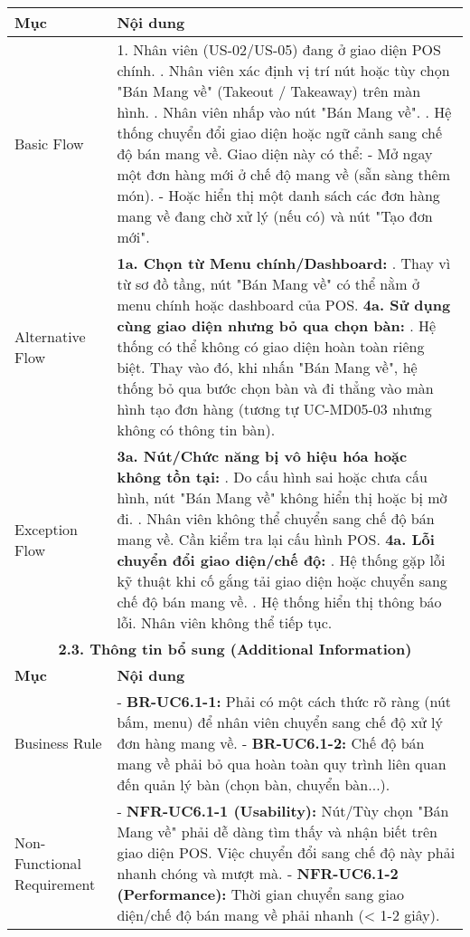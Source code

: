 \begin{longtable}{|m{4cm}|p{11cm}|}
\hline
\textbf{Mục} & \textbf{Nội dung} \\
\hline
Basic Flow & 1. Nhân viên (US-02/US-05) đang ở giao diện POS chính. \newline 2. Nhân viên xác định vị trí nút hoặc tùy chọn "Bán Mang về" (Takeout / Takeaway) trên màn hình. \newline 3. Nhân viên nhấp vào nút "Bán Mang về". \newline 4. Hệ thống chuyển đổi giao diện hoặc ngữ cảnh sang chế độ bán mang về. Giao diện này có thể: \newline    - Mở ngay một đơn hàng mới ở chế độ mang về (sẵn sàng thêm món). \newline    - Hoặc hiển thị một danh sách các đơn hàng mang về đang chờ xử lý (nếu có) và nút "Tạo đơn mới". \\
\hline
Alternative Flow & \textbf{1a. Chọn từ Menu chính/Dashboard:} \newline    1. Thay vì từ sơ đồ tầng, nút "Bán Mang về" có thể nằm ở menu chính hoặc dashboard của POS. \newline \textbf{4a. Sử dụng cùng giao diện nhưng bỏ qua chọn bàn:} \newline    1. Hệ thống có thể không có giao diện hoàn toàn riêng biệt. Thay vào đó, khi nhấn "Bán Mang về", hệ thống bỏ qua bước chọn bàn và đi thẳng vào màn hình tạo đơn hàng (tương tự UC-MD05-03 nhưng không có thông tin bàn). \\
\hline
Exception Flow & \textbf{3a. Nút/Chức năng bị vô hiệu hóa hoặc không tồn tại:} \newline    1. Do cấu hình sai hoặc chưa cấu hình, nút "Bán Mang về" không hiển thị hoặc bị mờ đi. \newline    2. Nhân viên không thể chuyển sang chế độ bán mang về. Cần kiểm tra lại cấu hình POS. \newline \textbf{4a. Lỗi chuyển đổi giao diện/chế độ:} \newline    1. Hệ thống gặp lỗi kỹ thuật khi cố gắng tải giao diện hoặc chuyển sang chế độ bán mang về. \newline    2. Hệ thống hiển thị thông báo lỗi. Nhân viên không thể tiếp tục. \\
\hline
\multicolumn{2}{|c|}{\textbf{2.3. Thông tin bổ sung (Additional Information)}} \\
\hline
\textbf{Mục} & \textbf{Nội dung} \\
\hline
Business Rule & - \textbf{BR-UC6.1-1:} Phải có một cách thức rõ ràng (nút bấm, menu) để nhân viên chuyển sang chế độ xử lý đơn hàng mang về. \newline - \textbf{BR-UC6.1-2:} Chế độ bán mang về phải bỏ qua hoàn toàn quy trình liên quan đến quản lý bàn (chọn bàn, chuyển bàn...). \\
\hline
Non-Functional Requirement & - \textbf{NFR-UC6.1-1 (Usability):} Nút/Tùy chọn "Bán Mang về" phải dễ dàng tìm thấy và nhận biết trên giao diện POS. Việc chuyển đổi sang chế độ này phải nhanh chóng và mượt mà. \newline - \textbf{NFR-UC6.1-2 (Performance):} Thời gian chuyển sang giao diện/chế độ bán mang về phải nhanh (< 1-2 giây). \\
\hline
\end{longtable}


